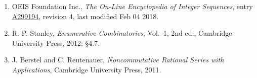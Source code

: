 \documentclass[11pt]{article}
\theoremstyle{definition}
\begin{document}
\begin{enumerate}

\item OEIS Foundation Inc., \emph{The On-Line Encyclopedia of Integer Sequences}, entry \href{https://oeis.org/A299194}{A299194}, revision 4, last modified Feb 04 2018.

\item R. P. Stanley, \emph{Enumerative Combinatorics}, Vol.~1, 2nd ed., Cambridge University Press, 2012; \S4.7.

\item J. Berstel and C. Reutenauer, \emph{Noncommutative Rational Series with Applications}, Cambridge University Press, 2011.

\end{enumerate}
\end{document}
